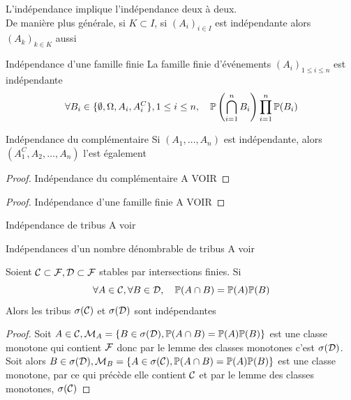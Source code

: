 \documentclass[]{report}
\begin{document}
\begin{prop}{}{}
    L'indépendance implique l'indépendance deux à deux.\\
    De manière plus générale, si $K\subset I$, si $(A_i)_{i\in I}$ est indépendante alors $(A_k)_{k\in K}$ aussi
\end{prop}

\begin{tm}{Indépendance d'une famille finie}{}
    La famille finie d'événements $(A_i)_{1\le i\le n}$ est indépendante \ssi
    \[\forall B_i\in \{\emptyset,\Omega,A_i,A_i^C\},1\le i \le n, \quad \mathbb{P}\left(\bigcap_{i=1}^n B_i\right) \prod_{i=1}^{n}\mathbb{P}(B_i)\]
\end{tm}

\begin{lm}{Indépendance du complémentaire}{}
    Si $(A_1,\ldots,A_n)$ est indépendante, alors $(A_1^C,A_2,\ldots,A_n)$ l'est également
\end{lm}

\begin{proof}{Indépendance du complémentaire}{}
    A VOIR
\end{proof}

\begin{proof}{Indépendance d'une famille finie}{}
    A VOIR
\end{proof}

\begin{df}{Indépendance de tribus}{}
    A voir
\end{df}

\begin{tm}{Indépendances d'un nombre dénombrable de tribus}{}
    A voir    
\end{tm}

\begin{tm}{}{}
    Soient $\mathcal{C}\subset \mathcal{F},\mathcal{D}\subset \mathcal{F}$ stables par intersections finies. Si
    \[\forall A\in \mathcal{C},\forall B\in \mathcal{D},\quad \mathbb{P}(A\cap B)=\mathbb{P}(A)\mathbb{P}(B)\]
    Alors les tribus $\sigma(\mathcal{C})$ et $\sigma(\mathcal{D})$ sont indépendantes
\end{tm}

\begin{proof}{}{}
    Soit $A\in \mathcal{C},\mathcal{M}_A=\{B\in \sigma (\mathcal{D}), \mathbb{P}(A\cap B)=\mathbb{P}(A)\mathbb{P}(B)\}$ est une classe monotone qui contient $\mathcal{F}$ donc par le lemme des classes monotones c'est $\sigma(\mathcal{D})$.\\
    Soit alors $B\in \sigma(\mathcal{D}),\mathcal{M}_B=\{A\in \sigma(\mathcal{C}),\mathbb{P}(A\cap B)=\mathbb{P}(A)\mathbb{P}(B)\}$ est une classe monotone, par ce qui précède elle contient $\mathcal{C}$ et par le lemme des classes monotones, $\sigma(\mathcal{C})$
\end{proof}
\end{document}
